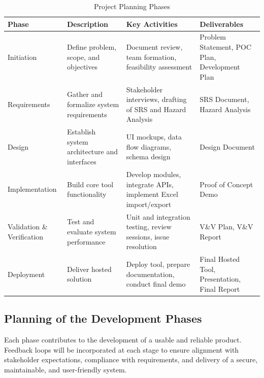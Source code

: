 \documentclass[12pt]{article}
\begin{document}
\begin{table}[h!]
\centering
\caption{Project Planning Phases}
\begin{tabularx}{\textwidth}{lXlX}
\toprule
\textbf{Phase} & \textbf{Description} & \textbf{Key Activities} & \textbf{Deliverables} \\
\midrule
Initiation & Define problem, scope, and objectives & Document review, team formation, feasibility assessment & Problem Statement, POC Plan, Development Plan \\
Requirements & Gather and formalize system requirements & Stakeholder interviews, drafting of SRS and Hazard Analysis & SRS Document, Hazard Analysis \\
Design & Establish system architecture and interfaces & UI mockups, data flow diagrams, schema design & Design Document \\
Implementation & Build core tool functionality & Develop modules, integrate APIs, implement Excel import/export & Proof of Concept Demo \\
Validation \& Verification & Test and evaluate system performance & Unit and integration testing, review sessions, issue resolution & V\&V Plan, V\&V Report \\
Deployment & Deliver hosted solution & Deploy tool, prepare documentation, conduct final demo & Final Hosted Tool, Presentation, Final Report \\
\bottomrule
\end{tabularx}
\end{table}

\subsection{Planning of the Development Phases}

Each phase contributes to the development of a usable and reliable product. Feedback loops will be incorporated at each stage to ensure alignment with stakeholder expectations, compliance with requirements, and delivery of a secure, maintainable, and user-friendly system.
\end{document}
